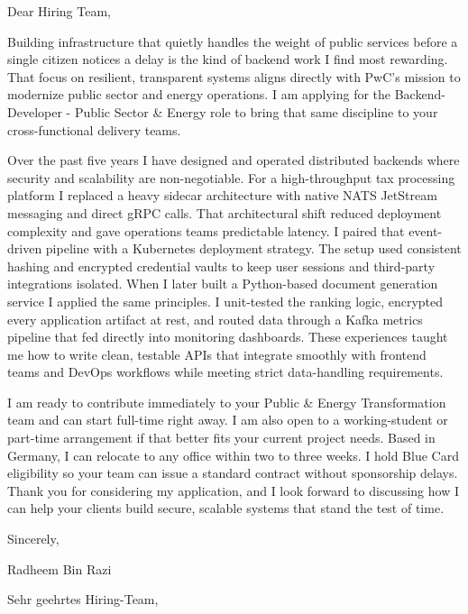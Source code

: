 \documentclass[11pt,a4paper]{coverletter}
\begin{document}

\opening{Dear Hiring Team,}

Building infrastructure that quietly handles the weight of public services before a single citizen notices a delay is the kind of backend work I find most rewarding. That focus on resilient, transparent systems aligns directly with PwC’s mission to modernize public sector and energy operations. I am applying for the Backend-Developer - Public Sector \& Energy role to bring that same discipline to your cross-functional delivery teams.

Over the past five years I have designed and operated distributed backends where security and scalability are non-negotiable. For a high-throughput tax processing platform I replaced a heavy sidecar architecture with native NATS JetStream messaging and direct gRPC calls. That architectural shift reduced deployment complexity and gave operations teams predictable latency. I paired that event-driven pipeline with a Kubernetes deployment strategy. The setup used consistent hashing and encrypted credential vaults to keep user sessions and third-party integrations isolated. When I later built a Python-based document generation service I applied the same principles. I unit-tested the ranking logic, encrypted every application artifact at rest, and routed data through a Kafka metrics pipeline that fed directly into monitoring dashboards. These experiences taught me how to write clean, testable APIs that integrate smoothly with frontend teams and DevOps workflows while meeting strict data-handling requirements.

I am ready to contribute immediately to your Public \& Energy Transformation team and can start full-time right away. I am also open to a working-student or part-time arrangement if that better fits your current project needs. Based in Germany, I can relocate to any office within two to three weeks. I hold Blue Card eligibility so your team can issue a standard contract without sponsorship delays. Thank you for considering my application, and I look forward to discussing how I can help your clients build secure, scalable systems that stand the test of time.

\closing{Sincerely,}{Radheem Bin Razi}

\clearpage
{}


\opening{Sehr geehrtes Hiring-Team,}
\end{document}
